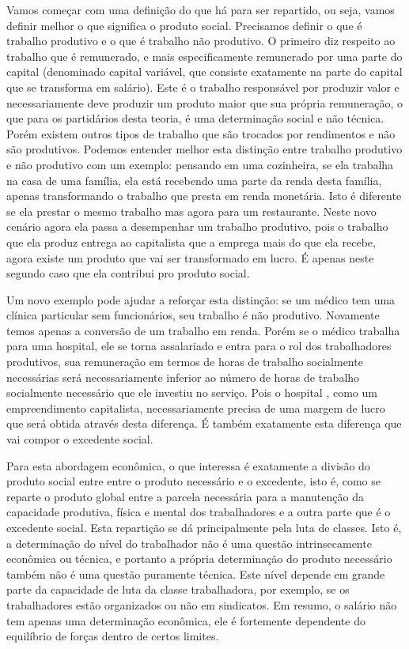 Vamos começar com uma definição do que há para ser repartido, ou seja, vamos definir melhor o que significa o produto social. Precisamos definir o que é trabalho produtivo e o que é trabalho não produtivo. O primeiro diz respeito ao trabalho que é remunerado, e mais especificamente remunerado por uma parte do capital (denominado capital variável, que consiste exatamente na parte do capital que se transforma em salário). Este é o trabalho responsável por produzir valor e necessariamente deve produzir um produto maior que sua própria remuneração, o que para os partidários desta teoria, é uma determinação social e não técnica.  Porém existem outros tipos de trabalho que são trocados por rendimentos e não são produtivos. Podemos entender melhor esta distinção entre trabalho produtivo e não produtivo com um exemplo: pensando em uma cozinheira, se ela trabalha na casa de uma família, ela está recebendo uma parte da renda desta família, apenas transformando o trabalho que presta em renda monetária. Isto é diferente se ela prestar o mesmo trabalho mas agora para um restaurante. Neste novo cenário agora ela passa a desempenhar um trabalho produtivo, pois o trabalho que ela produz entrega ao capitalista que a emprega mais do que ela recebe, agora existe um produto que vai ser  transformado em lucro. É apenas neste segundo caso que ela contribui pro produto social.

Um novo exemplo pode ajudar a reforçar esta distinção: se um médico tem uma clínica particular sem funcionários, seu trabalho é não produtivo. Novamente temos apenas a conversão de um trabalho em renda. Porém se o médico trabalha para uma hospital, ele se torna assalariado e entra para o rol dos trabalhadores produtivos, sua remuneração em termos de horas de trabalho socialmente necessárias será necessariamente inferior ao número de horas de trabalho socialmente necessário que ele investiu no serviço. Pois o hospital , como um empreendimento capitalista, necessariamente precisa de uma margem de lucro que será obtida através desta diferença. É também exatamente esta diferença que vai compor o excedente social.

Para esta abordagem econômica, o que interessa é exatamente a divisão do produto social entre entre o produto necessário e o excedente, isto é, como se reparte o produto global entre a parcela necessária para a manutenção da capacidade produtiva, física e mental dos trabalhadores e a outra parte que é o excedente social. Esta repartição se dá principalmente pela luta de classes. Isto é, a determinação do nível do trabalhador não é uma questão intrinsecamente econômica ou técnica, e portanto a própria determinação do produto necessário também  não é uma questão puramente técnica. Este nível depende em grande parte da capacidade de luta da classe trabalhadora, por exemplo, se os trabalhadores estão organizados ou não em sindicatos. Em resumo, o salário não tem apenas uma determinação econômica, ele é fortemente dependente do equilíbrio de forças dentro de certos limites.

